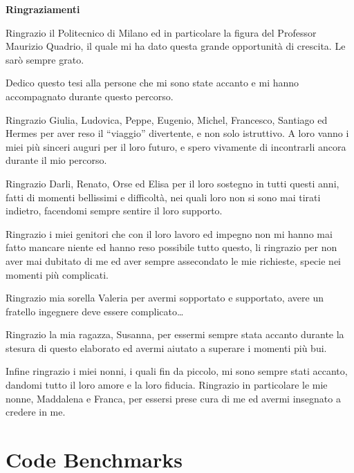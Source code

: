 \documentclass[a4paper,twosides,openright,titlepage]{book}
\newenvironment{abstract}%
	{\cleardoublepage%
		\thispagestyle{empty}%
		\null \vfill\begin{center}%
		\bfseries \abstractname \end{center}}%
	{\vfill\null}
\begin{document}
\renewcommand{\abstractname}{Ringraziamenti}
\begin{abstract}
\hrulefill

Ringrazio il Politecnico di Milano ed in particolare la figura del Professor Maurizio Quadrio, il quale mi ha dato questa grande opportunità di crescita. Le sarò sempre grato.\par
Dedico questo tesi alla persone che mi sono state accanto e mi hanno accompagnato durante questo percorso. \par
Ringrazio Giulia, Ludovica, Peppe, Eugenio, Michel, Francesco, Santiago ed Hermes per aver reso il ``viaggio'' divertente, e non solo istruttivo.
A loro vanno i miei più sinceri auguri per il loro futuro, e spero vivamente di incontrarli ancora durante il mio percorso.\par
Ringrazio Darli, Renato, Orse ed Elisa per il loro sostegno in tutti questi anni, fatti di momenti bellissimi e difficoltà, nei quali loro non si sono mai tirati indietro, facendomi sempre sentire il loro supporto.\par
Ringrazio i miei genitori che con il loro lavoro ed impegno non mi hanno mai fatto mancare niente ed hanno reso possibile tutto questo, li ringrazio per non aver mai dubitato di me ed aver sempre assecondato le mie richieste, specie nei momenti più complicati.\par
Ringrazio mia sorella Valeria per avermi sopportato e supportato, avere un fratello ingegnere deve essere complicato\dots \par
Ringrazio la mia ragazza, Susanna, per essermi sempre stata accanto durante la stesura di questo elaborato ed avermi aiutato a superare i momenti più bui.

Infine ringrazio i miei nonni, i quali fin da piccolo, mi sono sempre stati accanto, dandomi tutto il loro amore e la loro fiducia. Ringrazio in particolare le mie nonne, Maddalena e Franca, per essersi prese cura di me ed avermi insegnato a credere in me.\par
\hrulefill
\end{abstract}




\tableofcontents 



\mainmatter



%

\chapter{Code Benchmarks}






%



\backmatter
{} 
\printbibliography
\end{document}
